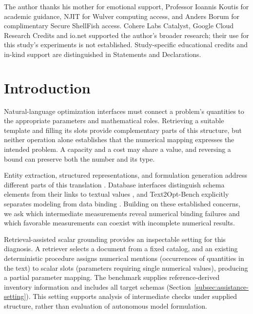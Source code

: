 \documentclass[pdflatex,iicol,sn-basic,Numbered]{sn-jnl}
\begin{document}
\maketitle



The author thanks his mother for emotional support, Professor Ioannis Koutis for academic guidance, NJIT for Wulver computing access, and Anders Borum for complimentary Secure ShellFish access. Cohere Labs Catalyst, Google Cloud Research Credits and io.net supported the author's broader research; their use for this study's experiments is not established. Study-specific educational credits and in-kind support are distinguished in Statements and Declarations.

\section{Introduction}
Natural-language optimization interfaces must connect a problem's quantities to the appropriate parameters and mathematical roles. Retrieving a suitable template and filling its slots provide complementary parts of this structure, but neither operation alone establishes that the numerical mapping expresses the intended problem. A capacity and a cost may share a value, and reversing a bound can preserve both the number and its type.

Entity extraction, structured representations, and formulation generation address different parts of this translation \cite{ramamonjison2022autoformulation,ramamonjison2023nl4opt,kadioglu2024ner4opt,ahmaditeshnizi2024optimus_icml}. Database interfaces distinguish schema elements from their links to textual values \cite{deng2021strug,wang2020ratsql}, and Text2Opt-Bench explicitly separates modeling from data binding \cite{gao2026models}. Building on these established concerns, we ask which intermediate measurements reveal numerical binding failures and which favorable measurements can coexist with incomplete numerical results.

Retrieval-assisted scalar grounding provides an inspectable setting for this diagnosis. A retriever selects a document from a fixed catalog, and an existing deterministic procedure assigns numerical mentions (occurrences of quantities in the text) to scalar slots (parameters requiring single numerical values), producing a partial parameter mapping. The benchmark supplies reference-derived inventory information and includes all target schemas (Section~\ref{subsec:assistance-setting}). This setting supports analysis of intermediate checks under supplied structure, rather than evaluation of autonomous model formulation.
\end{document}
